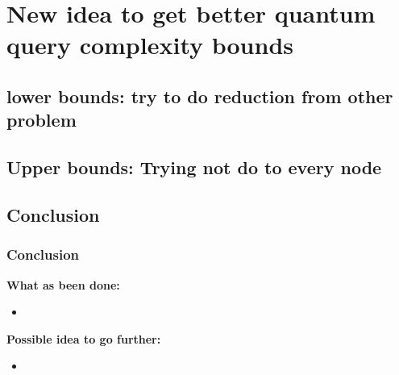 \documentclass[9pt, notheorems]{beamer}
\theoremstyle{definition}
\theoremstyle{plain}
\theoremstyle{definition}
\begin{document}
\section{New idea to get better quantum query complexity bounds }

\subsection{lower bounds: try to do reduction from other problem}
\begin{frame}
    \frametitle{}



\end{frame}
\subsection{Upper bounds: Trying not do to every node}
\begin{frame}
    \frametitle{}



\end{frame}
\subsection{Conclusion}

\begin{frame}
    \frametitle{Conclusion}
    \textbf{What as been done:}
    \begin{itemize}
        \item
    \end{itemize}
    \textbf{Possible idea to go further:}
    \begin{itemize}
        \item
    \end{itemize}

\end{frame}


\begin{frame}

\end{frame}
\end{document}
